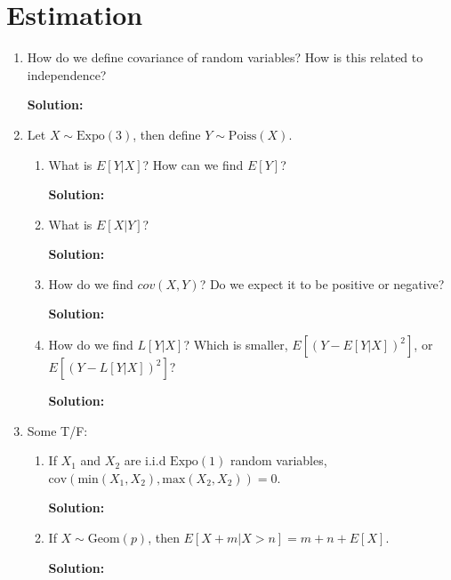 \documentclass{article}
\newenvironment{solution}{

            \color{blue} \smallskip \textbf{Solution:}}{}
\begin{document}
     \section{Estimation}
     \begin{enumerate}
        \item How do we define covariance of random variables? How is this related to independence?
        \begin{solution}
        \end{solution}
        \item Let $X \sim \text{Expo}(3)$, then define $Y \sim \text{Poiss}(X)$.
        \begin{enumerate}
            \item What is $E[Y|X]$? How can we find $E[Y]$?
            \begin{solution}
            \end{solution}
            \item What is $E[X|Y]$?
            \begin{solution}
            \end{solution}
            \item How do we find $cov(X, Y)$? Do we expect it to be positive or negative?
            \begin{solution}
            \end{solution}
            \item How do we find $L[Y|X]$? Which is smaller, $E[(Y - E[Y|X])^2]$, or $E[(Y - L[Y|X])^2]$?
            \begin{solution}
            \end{solution}
        \end{enumerate}
        \item Some T/F:
        \begin{enumerate}
            \item If $X_1$ and $X_2$ are i.i.d $\text{Expo}(1)$ random variables, $\text{cov}(\text{min}(X_1, X_2), \text{max}(X_2, X_2)) = 0$. 
            \begin{solution}
            \end{solution}
            \item If $X \sim \text{Geom}(p)$, then $E[X + m | X > n] = m+n+E[X]$.
            \begin{solution}
            \end{solution}
        \end{enumerate}
     \end{enumerate}
\end{document}
